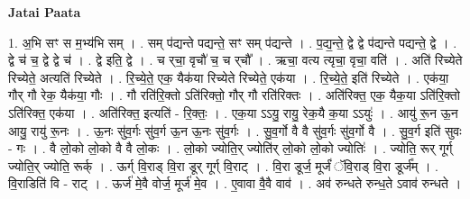 \documentclass[17pt]{extarticle}
\begin{document}
\textbf{Jatai Paata} \newline

1. अ॒भि सꣳ स म॒भ्य॑भि सम् । . सम् प॑द्यन्ते पद्यन्ते॒ सꣳ सम् प॑द्यन्ते । . प॒द्य॒न्ते॒ द्वे द्वे प॑द्यन्ते पद्यन्ते॒ द्वे । . द्वे च॑ च॒ द्वे द्वे च॑ । . द्वे इति॒ द्वे । . च र्‌चा॒ वृचौ॑ च॒ च र्‌चौ᳚ । . ऋचा॒ वत्य त्यृचा॒ वृचा॒ वति॑ । . अति॑ रिच्येते रिच्येते॒ अत्यति॑ रिच्येते । . रि॒च्ये॒ते॒ एक॒ यैक॑या रिच्येते रिच्येते॒ एक॑या । . रि॒च्ये॒ते॒ इति॑ रिच्येते । . एक॑या॒ गौर् गौ रेक॒ यैक॑या॒ गौः । . गौ रति॑रि॒क्तो ऽति॑रिक्तो॒ गौर् गौ रति॑रिक्तः । . अति॑रिक्त॒ एक॒ यैक॒या ऽति॑रि॒क्तो ऽति॑रिक्त॒ एक॑या । . अति॑रिक्त॒ इत्यति॑ - रि॒क्तः॒ । . एक॒या ऽऽयु॒ रायु॒ रेक॒यै क॒या ऽऽयुः॑ । . आयु॑ रू॒न ऊ॒न आयु॒ रायु॑ रू॒नः । . ऊ॒नः सु॑व॒र्गः सु॑व॒र्ग ऊ॒न ऊ॒नः सु॑व॒र्गः । . सु॒व॒र्गो वै वै सु॑व॒र्गः सु॑व॒र्गो वै । . सु॒व॒र्ग इति॑ सुवः - गः । . वै लो॒को लो॒को वै वै लो॒कः । . लो॒को ज्योति॒र् ज्योति॑र् लो॒को लो॒को ज्योतिः॑ । . ज्योति॒ रूर् गूर्ग् ज्योति॒र् ज्योति॒ रूर्क् । . ऊर्ग् वि॒राड् वि॒रा डूर् गूर्ग् वि॒राट् । . वि॒रा डूर्ज॒ मूर्जं॑ ॅवि॒राड् वि॒रा डूर्ज᳚म् । . वि॒राडिति॑ वि - राट् । . ऊर्ज॑ मे॒वै वोर्ज॒ मूर्ज॑ मे॒व । . ए॒वावा वै॒वै वाव॑ । . अव॑ रुन्धते रुन्ध॒ते ऽवाव॑ रुन्धते । \newline
\end{document}

